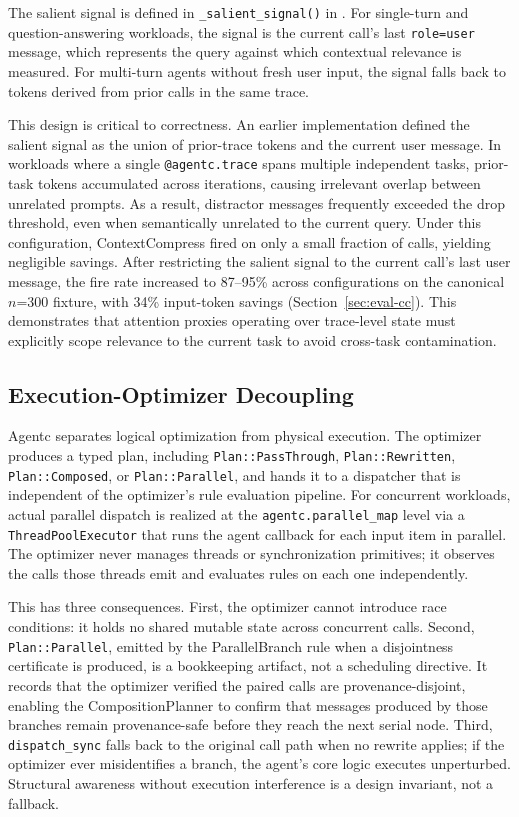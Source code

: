\documentclass[sigconf,9pt]{acmart}
\begin{document}
The salient signal is defined in \texttt{\_salient\_signal()} in
. For single-turn and question-answering workloads,
the signal is the current call's last \texttt{role=user} message, which represents
the query against which contextual relevance is measured. For multi-turn agents
without fresh user input, the signal falls back to tokens derived from prior calls in
the same trace.

This design is critical to correctness. An earlier implementation defined the salient
signal as the union of prior-trace tokens and the current user message. In workloads
where a single \texttt{@agentc.trace} spans multiple independent tasks, prior-task
tokens accumulated across iterations, causing irrelevant overlap between unrelated
prompts. As a result, distractor messages frequently exceeded the drop threshold, even
when semantically unrelated to the current query. Under this configuration,
ContextCompress fired on only a small fraction of calls, yielding negligible savings.
After restricting the salient signal to the current call's last user message, the fire
rate increased to 87--95\% across configurations on the canonical $n$=300 fixture,
with 34\% input-token savings (Section~\ref{sec:eval-cc}). This demonstrates that
attention proxies operating over trace-level state must explicitly scope relevance to
the current task to avoid cross-task contamination.

\subsection{Execution-Optimizer Decoupling}
\label{sec:decoupling}

Agentc separates logical optimization from physical execution. The optimizer
produces a typed plan, including \texttt{Plan::PassThrough}, \texttt{Plan::Rewritten},
\texttt{Plan::Composed}, or \texttt{Plan::Parallel}, and hands it to a
dispatcher that is independent of the optimizer's rule evaluation pipeline. For
concurrent workloads, actual parallel dispatch is realized at the
\texttt{agentc.parallel\_map} level via a \texttt{ThreadPoolExecutor} that runs
the agent callback for each input item in parallel. The optimizer never manages
threads or synchronization primitives; it observes the calls those threads emit
and evaluates rules on each one independently.

This has three consequences. First, the optimizer cannot introduce race
conditions: it holds no shared mutable state across concurrent calls. Second,
\texttt{Plan::Parallel}, emitted by the ParallelBranch rule when a disjointness
certificate is produced, is a bookkeeping artifact, not a scheduling directive.
It records that the optimizer verified the paired calls are provenance-disjoint,
enabling the CompositionPlanner to confirm that messages produced by those branches
remain provenance-safe before they reach the next serial node. Third,
\texttt{dispatch\_sync} falls back to the original call path when no rewrite
applies; if the optimizer ever misidentifies a branch, the agent's core logic
executes unperturbed. Structural awareness without execution interference is a
design invariant, not a fallback.
\end{document}
